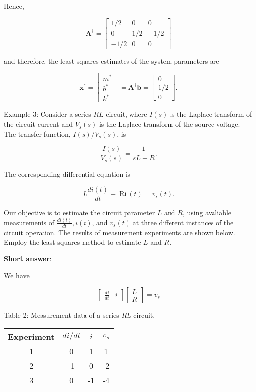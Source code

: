 Hence,

\[
	\boldsymbol{A}^{\dagger}=\left[\begin{array}{ccc}
		1 / 2 & 0 & 0 \\
		0 & 1 / 2 & -1 / 2 \\
		-1 / 2 & 0 & 0
	\end{array}\right]
\]

and therefore, the least squares estimates of the system parameters are

\[
	\boldsymbol{x}^{*}=\left[\begin{array}{c}
		m^{*} \\
		b^{*} \\
		k^{*}
	\end{array}\right]=\boldsymbol{A}^{\dagger} \boldsymbol{b}=\left[\begin{array}{c}
		0 \\
		1 / 2 \\
		0
	\end{array}\right] .
\]

Example 3: Consider a series \(R L\) circuit, where \(I(s)\) is the Laplace transform of the circuit current and \(V_{s}(s)\) is the Laplace transform of the source voltage. The transfer function, \(I(s) / V_{s}(s)\), is

\[
	\frac{I(s)}{V_{s}(s)}=\frac{1}{s L+R} .
\]

The corresponding differential equation is

\[
	L \frac{d i(t)}{d t}+\operatorname{Ri}(t)=v_{s}(t) .
\]

Our objective is to estimate the circuit parameter \(L\) and \(R\), using avaliable measurements of \(\frac{d i(t)}{d t}, i(t)\), and \(v_{s}(t)\) at three different instances of the circuit operation. The results of measurement experiments are shown below. Employ the least squares method to estimate \(L\) and \(R\).

\textbf{Short answer}:

We have

\[
	\left[\begin{array}{cc}
		\frac{d i}{d t} & i
	\end{array}\right]\left[\begin{array}{l}
		L \\
		R
	\end{array}\right]=v_{s}
\]

Table 2: Measurement data of a series \(R L\) circuit.

\begin{center}
	\begin{tabular}{c|ccc}
		Experiment & \(d i / d t\) & \(i\) & \(v_{s}\) \\
		\hline
		1 & 0 & 1 & 1 \\
		2 & -1 & 0 & -2 \\
		3 & 0 & -1 & -4 \\
	\end{tabular}
\end{center}

